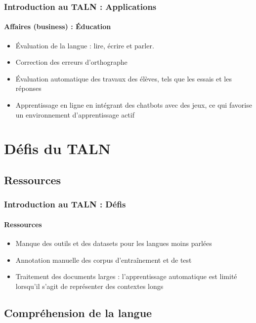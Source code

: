 \documentclass[xcolor=table]{beamer}
\begin{document}
\begin{frame}
\frametitle{Introduction au TALN : Applications}
\framesubtitle{Affaires (business) : Éducation}

\begin{itemize}
	\item Évaluation de la langue : lire, écrire et parler.
	\item Correction des erreurs d'orthographe 
	\item Évaluation automatique des travaux des élèves, tels que les essais et les réponses
	\item Apprentissage en ligne en intégrant des chatbots avec des jeux, ce qui favorise un environnement d'apprentissage actif
\end{itemize}

\end{frame}

\section{Défis du TALN}

%

\subsection{Ressources}

\begin{frame}
\frametitle{Introduction au TALN : Défis}
\framesubtitle{Ressources}

\begin{itemize}
	\item Manque des outils et des datasets pour les langues moins parlées
	\item Annotation manuelle des corpus d'entraînement et de test
	\item Traitement des documents larges : l'apprentissage automatique est limité lorsqu'il s'agit de représenter des contextes longs 
\end{itemize}
\end{frame}

\subsection{Compréhension de la langue}
\end{document}
